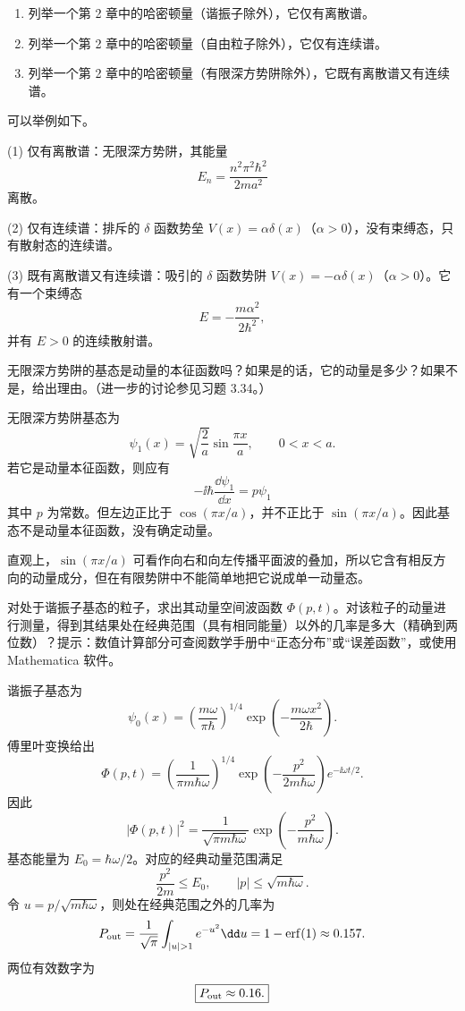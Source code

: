 \begin{question}
\begin{enumerate}
\item 列举一个第 2 章中的哈密顿量（谐振子除外），它仅有离散谱。
\item 列举一个第 2 章中的哈密顿量（自由粒子除外），它仅有连续谱。
\item 列举一个第 2 章中的哈密顿量（有限深方势阱除外），它既有离散谱又有连续谱。
\end{enumerate}
\end{question}
\begin{solution}
可以举例如下。

(1) 仅有离散谱：无限深方势阱，其能量
\[
E_n=\frac{n^2\pi^2\hbar^2}{2ma^2}
\]
离散。

(2) 仅有连续谱：排斥的 $\delta$ 函数势垒 $V(x)=\alpha\delta(x)$（$\alpha>0$），没有束缚态，只有散射态的连续谱。

(3) 既有离散谱又有连续谱：吸引的 $\delta$ 函数势阱 $V(x)=-\alpha\delta(x)$（$\alpha>0$）。它有一个束缚态
\[
E=-\frac{m\alpha^2}{2\hbar^2},
\]
并有 $E>0$ 的连续散射谱。
\end{solution}

\begin{question}
无限深方势阱的基态是动量的本征函数吗？如果是的话，它的动量是多少？如果不是，给出理由。（进一步的讨论参见习题 3.34。）
\end{question}
\begin{solution}
无限深方势阱基态为
\[
\psi_1(x)=\sqrt{\frac2a}\sin\frac{\pi x}{a},\qquad 0<x<a.
\]
若它是动量本征函数，则应有
\[
-\ii\hbar\frac{\dd\psi_1}{\dd x}=p\psi_1
\]
其中 $p$ 为常数。但左边正比于 $\cos(\pi x/a)$，并不正比于 $\sin(\pi x/a)$。因此基态不是动量本征函数，没有确定动量。

直观上，$\sin(\pi x/a)$ 可看作向右和向左传播平面波的叠加，所以它含有相反方向的动量成分，但在有限势阱中不能简单地把它说成单一动量态。
\end{solution}

\begin{question}
对处于谐振子基态的粒子，求出其动量空间波函数 $\Phi(p,t)$。对该粒子的动量进行测量，得到其结果处在经典范围（具有相同能量）以外的几率是多大（精确到两位数）？提示：数值计算部分可查阅数学手册中“正态分布”或“误差函数”，或使用 Mathematica 软件。
\end{question}
\begin{solution}
谐振子基态为
\[
\psi_0(x)=\left(\frac{m\omega}{\pi\hbar}\right)^{1/4}
\exp\left(-\frac{m\omega x^2}{2\hbar}\right).
\]
傅里叶变换给出
\[
\Phi(p,t)=\left(\frac1{\pi m\hbar\omega}\right)^{1/4}
\exp\left(-\frac{p^2}{2m\hbar\omega}\right)e^{-\ii\omega t/2}.
\]
因此
\[
|\Phi(p,t)|^2=\frac1{\sqrt{\pi m\hbar\omega}}
\exp\left(-\frac{p^2}{m\hbar\omega}\right).
\]
基态能量为 $E_0=\hbar\omega/2$。对应的经典动量范围满足
\[
\frac{p^2}{2m}\le E_0,
\qquad |p|\le \sqrt{m\hbar\omega}.
\]
令 $u=p/\sqrt{m\hbar\omega}$，则处在经典范围之外的几率为
\[
P_{\rm out}=\frac1{\sqrt\pi}\int_{|u|>1}e^{-u^2}\dd u
=1-\operatorname{erf}(1)\approx 0.157.
\]
两位有效数字为
\[
\boxed{P_{\rm out}\approx 0.16.}
\]
\end{solution}

